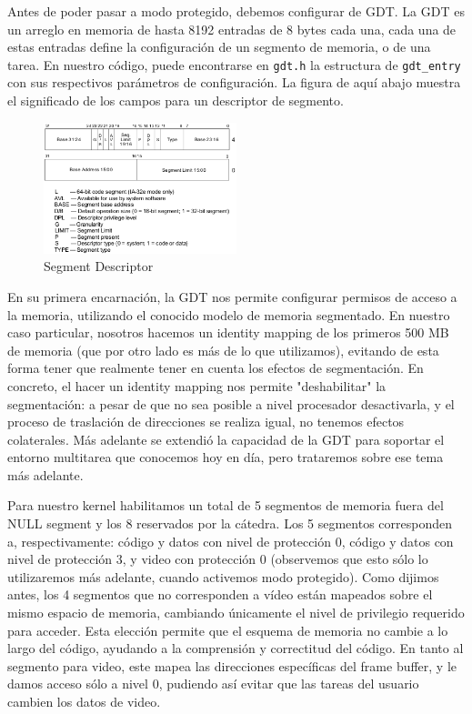 Antes de poder pasar a modo protegido, debemos configurar de GDT. La GDT es un arreglo en memoria de hasta 8192 entradas de 8 bytes cada una, cada una de estas entradas define la configuración de un segmento de memoria, o de una tarea. En nuestro código, puede encontrarse en \texttt{gdt.h} la estructura de \texttt{gdt\_entry} con sus respectivos parámetros de configuración. La figura de aquí abajo muestra el significado de los campos para un descriptor de segmento.

\begin{figure}[h!]
  \centering
    \includegraphics[width=0.5\textwidth]{images/segment_descriptor}
  \caption{Segment Descriptor}
\end{figure}

En su primera encarnación, la GDT nos permite configurar permisos de acceso a la memoria, utilizando el conocido modelo de memoria segmentado. En nuestro caso particular, nosotros hacemos un identity mapping de los primeros 500 MB de memoria (que por otro lado es más de lo que utilizamos), evitando de esta forma tener que realmente tener en cuenta los efectos de segmentación. En concreto, el hacer un identity mapping nos permite "deshabilitar" la segmentación: a pesar de que no sea posible a nivel procesador desactivarla, y el proceso de traslación de direcciones se realiza igual, no tenemos efectos colaterales. Más adelante se extendió la capacidad de la GDT para soportar el entorno multitarea que conocemos hoy en día, pero trataremos sobre ese tema más adelante.

Para nuestro kernel habilitamos un total de 5 segmentos de memoria fuera del NULL segment y los 8 reservados por la cátedra. Los 5 segmentos corresponden a, respectivamente: código y datos con nivel de protección 0, código y datos con nivel de protección 3, y video con protección 0 (observemos que esto sólo lo utilizaremos más adelante, cuando activemos modo protegido). Como dijimos antes, los 4 segmentos que no corresponden a vídeo están mapeados sobre el mismo espacio de memoria, cambiando únicamente el nivel de privilegio requerido para acceder. Esta elección permite que el esquema de memoria no cambie a lo largo del código, ayudando a la comprensión y correctitud del código. En tanto al segmento para video, este mapea las direcciones específicas del frame buffer, y le damos acceso sólo a nivel 0, pudiendo así evitar que las tareas del usuario cambien los datos de video.

